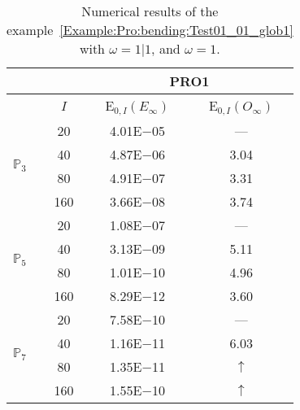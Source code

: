 \begin{table}[H]
\caption{Numerical results of the example~\ref{Example:Pro:bending:Test01_01_glob1} with $\omega=1|1$, and $\omega=1$.}
\setlength{\tabcolsep}{5pt}
\centering
\begin{tabular}{@{}l c c c@{}}
\toprule
 &  & \multicolumn{2}{c}{PRO1}\\
\midrule
 & $I$ & E$_{0,I}(E_{\infty})$ & E$_{0,I}(O_{\infty})$\\
\midrule
\multirow{4}{*}{$\mathbb{P}_{3}$} & 20 & 4.01E$-$05 & ---\\
 & 40 & 4.87E$-$06 & 3.04\\
 & 80 & 4.91E$-$07 & 3.31\\
 & 160 & 3.66E$-$08 & 3.74\\
\midrule
\multirow{4}{*}{$\mathbb{P}_{5}$} & 20 & 1.08E$-$07 & ---\\
 & 40 & 3.13E$-$09 & 5.11\\
 & 80 & 1.01E$-$10 & 4.96\\
 & 160 & 8.29E$-$12 & 3.60\\
\midrule
\multirow{4}{*}{$\mathbb{P}_{7}$} & 20 & 7.58E$-$10 & ---\\
 & 40 & 1.16E$-$11 & 6.03\\
 & 80 & 1.35E$-$11 & $\uparrow$\\
 & 160 & 1.55E$-$10 & $\uparrow$\\
\bottomrule
\end{tabular}
\label{Table:PRO:test_01_01_test22}
\end{table}
